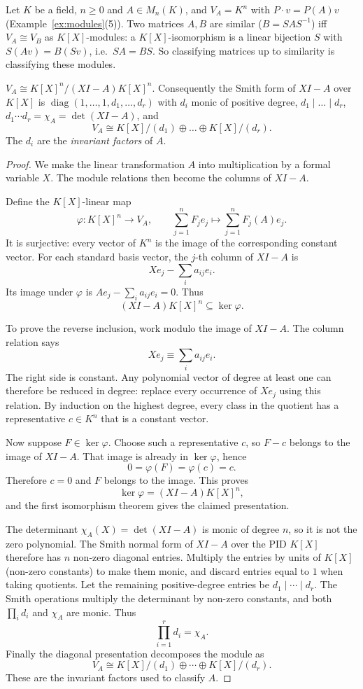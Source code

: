 Let $K$ be a field, $n\ge0$ and $A\in M_n(K)$, and $V_A=K^n$ with $P\cdot v=P(A)v$ (Example~\ref{ex:modules}(5)). Two matrices $A,B$ are similar ($B=SAS^{-1}$) iff $V_A\cong V_B$ as $K[X]$-modules: a $K[X]$-isomorphism is a linear bijection $S$ with $S(Av)=B(Sv)$, i.e.\ $SA=BS$. So classifying matrices up to similarity is classifying these modules.

\begin{proposition}\label{prop:presentation}
$V_A\cong K[X]^n/(XI-A)K[X]^n$. Consequently the Smith form of $XI-A$ over $K[X]$ is $\operatorname{diag}(1,\dots,1,d_1,\dots,d_r)$ with $d_i$ monic of positive degree, $d_1\mid\dots\mid d_r$, $d_1\cdots d_r=\chi_A=\det(XI-A)$, and
\[
V_A\cong K[X]/(d_1)\oplus\dots\oplus K[X]/(d_r).
\]
The $d_i$ are the \emph{invariant factors} of $A$.
\end{proposition}
\begin{proof}
We make the linear transformation $A$
into multiplication by a formal variable $X$.
The module relations then become the columns
of $XI-A$.

Define the $K[X]$-linear map
\[
\varphi:K[X]^n\to V_A,\qquad
\sum_{j=1}^n F_je_j
\longmapsto\sum_{j=1}^nF_j(A)e_j.
\]
It is surjective: every vector of $K^n$
is the image of the corresponding constant
vector. For each standard basis vector,
the $j$-th column of $XI-A$ is
\[
Xe_j-\sum_i a_{ij}e_i.
\]
Its image under $\varphi$ is
$Ae_j-\sum_i a_{ij}e_i=0$.
Thus
\[
(XI-A)K[X]^n\subseteq\ker\varphi.
\]

To prove the reverse inclusion, work
modulo the image of $XI-A$.
The column relation says
\[
Xe_j\equiv\sum_i a_{ij}e_i.
\]
The right side is constant. Any
polynomial vector of degree at least
one can therefore be reduced in
degree: replace every occurrence of
$Xe_j$ using this relation.
By induction on the highest degree,
every class in the quotient has
a representative $c\in K^n$
that is a constant vector.

Now suppose $F\in\ker\varphi$.
Choose such a representative $c$,
so $F-c$ belongs to the image of
$XI-A$. That image is already in
$\ker\varphi$, hence
\[
0=\varphi(F)=\varphi(c)=c.
\]
Therefore $c=0$ and $F$ belongs to
the image. This proves
\[
\ker\varphi=(XI-A)K[X]^n,
\]
and the first isomorphism theorem
gives the claimed presentation.

The determinant $\chi_A(X)=\det(XI-A)$
is monic of degree $n$, so it is not
the zero polynomial. The Smith normal
form of $XI-A$ over the PID $K[X]$
therefore has $n$ non-zero diagonal
entries. Multiply the entries by
units of $K[X]$ (non-zero constants)
to make them monic, and discard
entries equal to $1$ when taking
quotients. Let the remaining
positive-degree entries be
$d_1\mid\cdots\mid d_r$.
The Smith operations multiply the
determinant by non-zero constants,
and both $\prod_i d_i$ and
$\chi_A$ are monic. Thus
\[
\prod_{i=1}^r d_i=\chi_A.
\]
Finally the diagonal presentation
decomposes the module as
\[
\boxed{V_A\cong
K[X]/(d_1)\oplus\cdots\oplus K[X]/(d_r)}.
\]
These are the invariant factors
used to classify $A$.
\end{proof}

